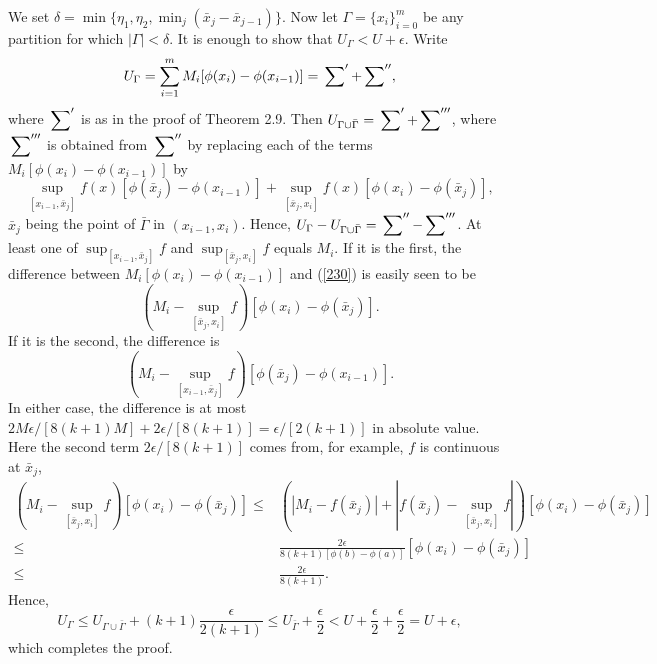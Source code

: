 \begin{exercise}{2.12}
We set $\delta=\min\{\eta_1,\eta_2,\min_j(\bar{x}_j-\bar{x}_{j-1})\}$.
Now let $\Gamma=\{x_i\}_{i=0}^m$ be any partition for which $|\Gamma|<\delta$.
It is enough to show that $U_{\Gamma}<U+\epsilon.$
Write
$$U_\Gamma=\sum_{i=1}^mM_i[\phi(x_i)-\phi(x_{i-1})]=\sideset{}{'}{\sum}+\sideset{}{''}{\sum},$$
where $\sideset{}{'}{\sum}$ is as in the proof of Theorem 2.9. Then $U_{\Gamma\cup\bar{\Gamma}}=\sideset{}{'}{\sum}+\sideset{}{'''}{\sum}$, where $\sideset{}{'''}{\sum}$ is obtained from $\sideset{}{''}{\sum}$ by replacing each of the terms $M_i[\phi(x_i)-\phi(x_{i-1})]$ by
\begin{equation}\label{230}
\sup _{\left[x_{i-1}, \bar{x}_{j}\right]} f(x)\left[\phi\left(\bar{x}_{j}\right)-\phi\left(x_{i-1}\right)\right]+\sup _{\left[\bar{x}_{j}, x_{i}\right]} f(x)\left[\phi\left(x_{i}\right)-\phi\left(\bar{x}_{j}\right)\right],
\end{equation}
$\bar{x}_{j}$ being the point of $\bar{\Gamma}$ in $(x_{i-1},x_i)$. Hence, $U_{\Gamma}-U_{\Gamma\cup\bar{\Gamma}}=\sideset{}{''}{\sum}-\sideset{}{'''}{\sum}$.
At least one of $\sup _{\left[x_{i-1}, \bar{x}_{j}\right]}f$ and $\sup _{\left[\bar{x}_{j}, x_{i}\right]} f$ equals $M_i$. If it is the first, the difference between $M_i[\phi(x_i)-\phi(x_{i-1})]$ and (\ref{230}) is easily seen to be
$$\left(M_{i}-\sup _{\left[\bar{x}_{j}, x_{i}\right]} f\right)\left[\phi\left(x_{i}\right)-\phi\left(\bar{x}_{j}\right)\right].$$
If it is the second, the difference is
$$\left(M_{i}-\sup _{\left[x_{i-1}, \bar{x}_{j}\right]} f\right)\left[\phi\left(\bar{x}_{j}\right)-\phi\left(x_{i-1}\right)\right].$$
In either case, the difference is at most $2M\epsilon/[8(k+1)M]+2\epsilon/[8(k+1)]=\epsilon/[2(k+1)]$ in absolute value. Here the second term $2\epsilon/[8(k+1)]$ comes from, for example, $f$ is continuous at $\bar{x}_j$,
\begin{equation*}
  \begin{aligned}
    \left(M_{i}-\sup _{\left[\bar{x}_{j}, x_{i}\right]} f\right)\left[\phi\left(x_{i}\right)-\phi\left(\bar{x}_{j}\right)\right] \leq&\left(|M_i-f(\bar{x}_j)|+|f(\bar{x}_j)-\sup _{\left[\bar{x}_{j}, x_{i}\right]} f|\right)\left[\phi\left(x_{i}\right)-\phi\left(\bar{x}_{j}\right)\right]\\
    \leq&\frac{2\epsilon}{8(k+1)[\phi(b)-\phi(a)]}\left[\phi\left(x_{i}\right)-\phi\left(\bar{x}_{j}\right)\right]\\
    \leq&\frac{2\epsilon}{8(k+1)}.
  \end{aligned}
\end{equation*}
Hence,
\begin{equation*}
  U_{\Gamma}\leq U_{\Gamma\cup\bar{\Gamma}}+(k+1)\frac{\epsilon}{2(k+1)}\leq U_{\bar{\Gamma}}+\frac{\epsilon}{2}<U+\frac{\epsilon}{2}+\frac{\epsilon}{2}=U+\epsilon,
\end{equation*}
which completes the proof.
\end{exercise}

